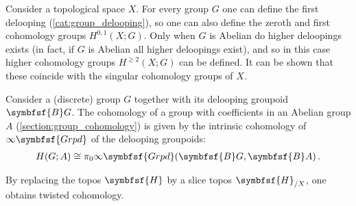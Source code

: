         \begin{example}
            Consider a topological space $X$. For every group $G$ one can define the first delooping (\cref{cat:group_delooping}), so one can also define the zeroth and first cohomology groups $H^{0,1}(X;G)$. Only when $G$ is Abelian do higher deloopings exists (in fact, if $G$ is Abelian all higher deloopings exist), and so in this case higher cohomology groups $H^{\geq 2}(X;G)$ can be defined. It can be shown that these coincide with the singular cohomology groups of $X$.
        \end{example}
    
        \begin{example}
            Consider a (discrete) group $G$ together with its delooping groupoid $\symbfsf{B}G$. The cohomology of a group with coefficients in an Abelian group $A$ (\cref{section:group_cohomology}) is given by the intrinsic cohomology of $\infty\symbfsf{Grpd}$ of the delooping groupoids:
            \begin{gather}
                H(G;A)\cong\pi_0\infty\symbfsf{Grpd}(\symbfsf{B}G,\symbfsf{B}A)\,.
            \end{gather}
        \end{example}
    
        By replacing the topos $\symbfsf{H}$ by a slice topos $\symbfsf{H}_{/X}$, one obtains twisted cohomology.

